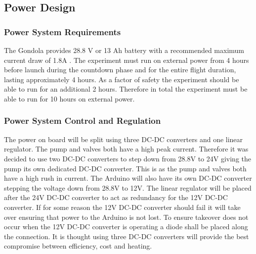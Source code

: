 \pagebreak
\subsection{Power Design}

\subsubsection{Power System Requirements}
\begin{centering}
The Gondola provides 28.8 V or 13 Ah battery with a recommended maximum current draw of 1.8A \cite{BexusManual}. The experiment must run on external power from 4 hours before launch during the countdown phase and for the entire flight duration, lasting approximately 4 hours. As a factor of safety the experiment should be able to run for an additional 2 hours. Therefore in total the experiment must be able to run for 10 hours on external power.
\end{centering}



\subsubsection{Power System Control and Regulation}
The power on board will be split using three DC-DC converters and one linear regulator. The pump and valves both have a high peak current. Therefore it was decided to use two DC-DC converters to step down from 28.8V to 24V giving the pump its own dedicated DC-DC converter. This is as the pump and valves both have a high rush in current. The Arduino will also have its own DC-DC converter stepping the voltage down from 28.8V to 12V. The linear regulator will be placed after the 24V DC-DC converter to act as redundancy for the 12V DC-DC converter. If for some reason the 12V DC-DC converter should fail it will take over ensuring that power to the Arduino is not lost. To ensure takeover does not occur when the 12V DC-DC converter is operating a diode shall be placed along the connection. It is thought using three DC-DC converters will provide the best compromise between efficiency, cost and heating.

\raggedbottom
